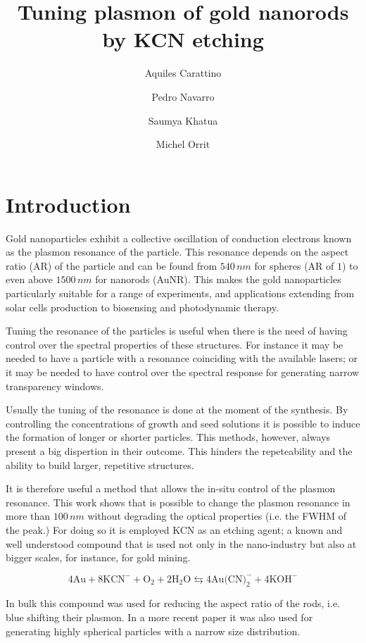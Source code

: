\documentclass[twocolumn]{article}
\title{Tuning plasmon of gold nanorods by KCN etching}
\author{Aquiles Carattino \and Pedro Navarro \and Saumya Khatua \and Michel
Orrit}
\begin{document}
\maketitle
{}

\section{Introduction}
Gold nanoparticles exhibit a collective oscillation of conduction electrons
known as the plasmon resonance of the particle. This resonance depends on the
aspect ratio (AR) of the particle and can be found from  $540\,nm$ for spheres
(AR of $1$) to even above $1500\,nm$ for nanorods (AuNR). This makes the gold
nanoparticles particularly suitable for a range of experiments, and applications
extending from solar cells production\cite{catchpoleplasmonic2008} to biosensing
and photodynamic therapy.

Tuning the resonance of the particles is useful when there is the need of having
control over the spectral properties of these structures. For instance it may be
needed to have a particle with a resonance coinciding with the available lasers;
or it may be needed to have control over the spectral response for generating
narrow transparency windows\cite{biswasplasmon-induced2013}.

Usually the tuning of the resonance is done at the moment of the synthesis. By
controlling the concentrations of growth and seed solutions it is possible to
induce the formation of longer or shorter particles. This methods, however,
always present a big dispertion in their outcome. This hinders the repeteability
and the ability to build larger, repetitive structures.

It is therefore useful a method that allows the in-situ control of the plasmon
resonance. This work shows that is possible to change the plasmon resonance in
more than $100\,nm$ without degrading the optical properties (i.e. the FWHM of
the peak.) For doing so it is employed KCN as an etching agent; a known and well
understood compound that is used not only in the nano-industry but also at
bigger scales, for instance, for gold mining.

\begin{equation}
4\textrm{Au} + 8\textrm{KCN}^-+\textrm{O}_2 + 2\textrm{H}_2\textrm{O}
\leftrightarrows 4\textrm{Au(CN)}_2^-+4\textrm{KOH}^-
\end{equation}

In bulk this compound was used for reducing the aspect ratio of the rods, i.e.
blue shifting their plasmon. In a more recent paper it was also used for
generating highly spherical particles with a narrow size
distribution\cite{leeultrasmooth2013}.
\end{document}
